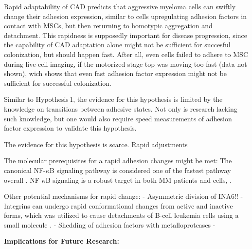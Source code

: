 
Rapid adaptability of \ac{CAD} predicts that aggressive myeloma cells can
swiftly change their adhesion expression, similar to \INA cells upregulating
adhesion factors in contact with \acp{MSC}, but then returning to homotypic
aggregation and detachment. This rapidness is supposedly important for disease
progression, since the capability of \ac{CAD} adaptation  alone might not be
sufficient for succesful colonization, but should happen fast. After all, even
\INA cells failed to adhere to \ac{MSC} during live-cell imaging, if the
motorized stage top was moving too fast (data not shown), wich shows that even
fast adhesion factor expression might not be sufficient for successful
colonization.

Similar to Hypothesis\,1, the evidence for this hypothesis is limited by
the knowledge on transitions between adhesive states. Not only is research lacking
such knowledge, but one would also require speed measurements of adhesion factor
expression to validate this hypothesis.

The
evidence for this hypothesis is scarce.
Rapid adjustments



The molecular prerequisites  for a rapid adhesion changes might be met:
The
canonical NF-$\kappa$B signaling pathway is considered one of the fastest
pathway overall \cite{gallego-sellesFastRegulationNFkB2022,
      zarnegarNoncanonicalNFkBActivation2008}. NF-$\kappa$B signaling is a
robust target in both MM patients and \INA cells,
\cite{sarinEvaluatingEfficacyMultiple2020}.



Other potential mechanisms for rapid change:
- Asymmetric division of INA6!!
- Integrins can undergo rapid conformational changes from active and inactive
forms, which was utilized to cause detachments of B-cell leukemia cells
using a small molecule \cite{ruanVitroVivoEffects2022}.
- Shedding of adhesion factors with metalloproteases
-



\textbf{Implications for Future Research:}


